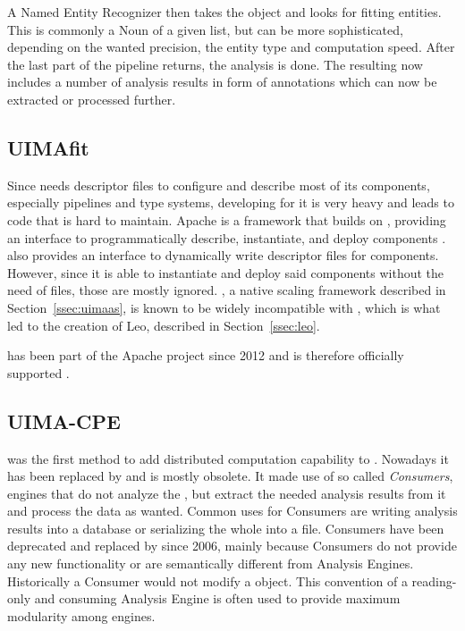 A Named Entity Recognizer then takes the \cas{} object and looks for fitting entities. This is commonly a Noun of a given list, but can be more sophisticated, depending on the wanted precision, the entity type and computation speed. After the last part of the pipeline returns, the analysis is done. The resulting \cas{} now includes a number of analysis results in form of annotations which can now be extracted or processed further.

\subsection{UIMAfit}
\label{ssec:uimafit}
Since \uima{} needs \xml{} descriptor files to configure and describe most of its components, especially pipelines and type systems, developing for it is very \xml{} heavy and leads to code that is hard to maintain. Apache \uimafit{} is a framework that builds on \uima{}, providing an interface to programmatically describe, instantiate, and deploy \uima{} components \cite{ogren-bethard:2009:SETQA-NLP}. \uimafit{} also provides an interface to dynamically write \xml{} descriptor files for \uima{} components. However, since it is able to instantiate and deploy said components without the need of \xml{} files, those are mostly ignored. \uimaas{}, a native \uima{} scaling framework described in Section~\ref{ssec:uimaas}, is known to be widely incompatible with \uimafit{}, which is what led to the creation of Leo, described in Section~\ref{ssec:leo}.

\uimafit{} has been part of the Apache \uima{} project since 2012 and is therefore officially supported \cite{github:uimafit}. 



\subsection{UIMA-CPE}
\label{ssec:uimacpe}
\uimacpe{} was the first method to add distributed computation capability to \uima{}. Nowadays it has been replaced by \uimaas{} and is mostly obsolete. It made use of so called \emph{\cas{} Consumers}, engines that do not analyze the \cas{}, but extract the needed analysis results from it and process the data as wanted. Common uses for \cas{} Consumers are writing analysis results into a database or serializing the whole \cas{} into a \xmi{} file. \cas{} Consumers have been deprecated and replaced by \anens{} since 2006, mainly because \cas{} Consumers do not provide any new functionality or are semantically different from Analysis Engines. Historically a \cas{} Consumer would not modify a \cas{} object. This convention of a reading-only and consuming Analysis Engine is often used to provide maximum modularity among \uima{} engines.


